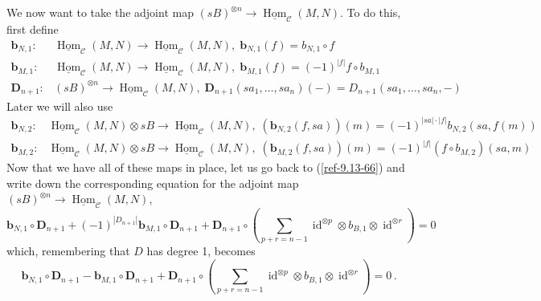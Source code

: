 \documentclass{amsart}
\numberwithin{equation}{section}
\let\cal\mathcal
\theoremstyle{definition}
\theoremstyle{remark}
\begin{document}
We now want to take the adjoint map $(sB)^{\otimes n}\to \underline{\operatorname {Hom}}_{{\cal C}}(M,N)$. To do this, first define 
\begin{align*}
\textbf{b}_{N,1}: &  \underline{\operatorname {Hom}}_{{\cal C}}(M,N)\to\underline{\operatorname {Hom}}_{{\cal C}}(M,N),\; \textbf{b}_{N,1}(f)=b_{N,1} \circ f\\
\textbf{b}_{M,1}: & \underline{\operatorname {Hom}}_{{\cal C}}(M,N)\to\underline{\operatorname {Hom}}_{{\cal C}}(M,N),\; \textbf{b}_{M,1}(f)=(-1)^{|f|} f\circ b_{M,1} \\
\textbf{D}_{n+1}: & (sB)^{\otimes n}\to \underline{\operatorname {Hom}}_{{\cal C}}(M,N),\; \textbf{D}_{n+1}(sa_1,\ldots,sa_n)(-)=D_{n+1}(sa_1,\ldots,sa_n,-)
\end{align*}
Later we will also use
\begin{align*}
\textbf{b}_{N,2}: &  \underline{\operatorname {Hom}}_{{\cal C}}(M,N)\otimes sB\to\underline{\operatorname {Hom}}_{{\cal C}}(M,N),\; (\textbf{b}_{N,2}(f,sa))(m)=(-1)^{|sa|\cdot |f|}b_{N,2}(sa,f(m)) \\
\textbf{b}_{M,2}: & \underline{\operatorname {Hom}}_{{\cal C}}(M,N)\otimes sB\to\underline{\operatorname {Hom}}_{{\cal C}}(M,N),\; (\textbf{b}_{M,2}(f,sa))(m)=(-1)^{|f|} (f\circ b_{M,2})(sa,m) 
\end{align*}
Now that we have all of these maps in place, let us go back to
(\ref{ref-9.13-66}) and write down the corresponding equation for the adjoint
map $(sB)^{\otimes n}\to \underline{\operatorname {Hom}}_{{\cal C}}(M,N)$,
\[\textbf{b}_{N,1} \circ \textbf{D}_{n+1} +(-1)^{|D_{n+1}|}\textbf{b}_{M,1}\circ \textbf{D}_{n+1} + \textbf{D}_{n+1}\circ \left( \sum_{p+r=n-1} {{\operatorname {id}}}^{\otimes p}\otimes b_{B,1}\otimes {{\operatorname {id}}}^{\otimes r}\right)=0\]
which, remembering that $D$ has degree 1, becomes
\[\textbf{b}_{N,1} \circ \textbf{D}_{n+1}-\textbf{b}_{M,1}\circ \textbf{D}_{n+1} + \textbf{D}_{n+1}\circ \left( \sum_{p+r=n-1} {{\operatorname {id}}}^{\otimes p}\otimes b_{B,1}\otimes {{\operatorname {id}}}^{\otimes r}\right)=0\,.\]
\end{document}
